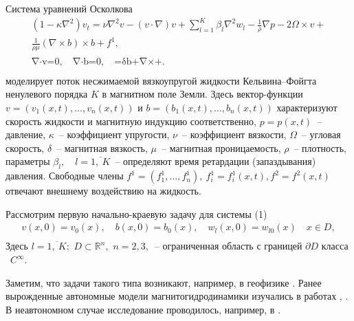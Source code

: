 Система уравнений Осколкова
\begin{equation}
\begin{array}{l}
(1-\kappa\nabla^2)v_t=\nu\nabla^2v-(v\cdot\nabla)v+\displaystyle\sum_{l=1}^K \beta_{l}\nabla^{2} w_{l}-\frac{1}{\rho}\nabla p-2\Omega\times v+
\\  \frac{1}{\rho\mu}(\nabla\times b)\times b+f^{1},  \\
\mathop{\mathop\nabla\cdot v=0, \quad \nabla\cdot b=0, \quad b_t=\delta\nabla^2b+\nabla\times(v\times b)+f^{2}.
\quad}\limits^{\ }\\
\mathop{\mathop{\dfrac{\partial w_{l}}{\partial t}=v+\alpha_{l}w_{l}, \quad \alpha_{l}\in {\mathbb{R_-}}, \quad \beta_{l}\in {\mathbb{R_+}}, \quad l=\overline{1,~K},\quad}\limits^{\ }}
\limits^{\ }
\end{array}
\label{u1}
\end{equation}%
моделирует поток несжимаемой вязкоупругой жидкости Кельвина--Фойгта  ненулевого порядка $K$ \cite{OAPN} в магнитном поле Земли.  Здесь вектор-функции $v=(v_1(x,t),
\ldots,v_n(x,t))$ и $b=(b_1(x,t),
\ldots,b_n(x,t))$
характеризуют скорость жидкости и магнитную индукцию соответственно, $p=p(x,t)$~-- давление, $\kappa$~-- коэффициент упругости, $\nu$~-- коэффициент вязкости, $\Omega$~-- угловая
скорость, $\delta$~-- магнитная вязкость, $\mu$~-- магнитная проницаемость, $\rho$~-- плотность, параметры $\beta_{l}, \quad l=\overline{1,~K}$~-- определяют время ретардации (запаздывания) давления. Свободные члены
$f^{1}=(f^{1}_{1},\ldots , f^{1}_{n}),~ f^{1}_{i}=f^{1}_{i}(x,t), f^{2}=f^{2}(x,t)$
отвечают внешнему воздействию на жидкость.

Рассмотрим первую начально-краевую задачу для системы (1)
\begin{equation}
\begin{array}{l}
v(x,0)=v_0(x), \quad b(x,0)=b_0(x),  \quad  w_{l}(x,0)=w_{l0}(x) \quad x\in D,\\
\mathop{\mathop{
v(x,t)=0, \quad b(x,t)=0, \quad  w_{l}(x,t)=0 \quad  (x,t)\in\partial D\times\mathbb{R}_+.
\quad}\limits^{\ }}
\end{array}
\label{u2}
\end{equation}%
Здесь $l=\overline{1,~K};$ \quad $D\subset\mathbb{R}^n,$
$n=2,3,$~-- ограниченная область с границей $\partial D$ класса ~$C^\infty.$

Заметим, что задачи такого типа возникают, например, в геофизике \cite{HROP}.
Ранее вырожденные автономные модели магнитогидродинамики
изучались в работах \cite{STGF}, \cite{STGFN}. В неавтономном случае исследование проводилось, например, в
\cite{KS19}.

